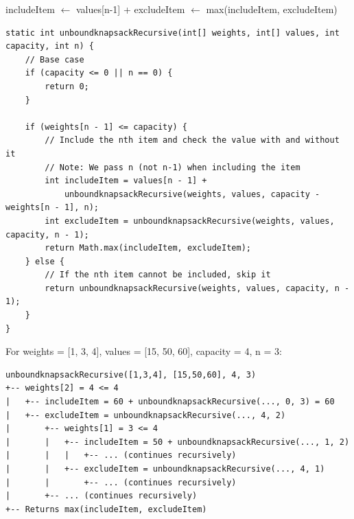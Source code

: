 \documentclass{article}
\begin{document}
\begin{tcolorbox}[title=Algorithm: Recursive Approach]
\begin{algorithm}[H]
\begin{algorithmic}[1]
    \EndIf
    
        \State includeItem $\gets$ values[n-1] + 
        \State excludeItem $\gets$ 
        \Return max(includeItem, excludeItem)
    \Else
        \Return {}
    \EndIf
\EndFunction
\end{algorithmic}
\end{algorithm}
\end{tcolorbox}

\begin{lstlisting}[caption=Recursive Implementation]
static int unboundknapsackRecursive(int[] weights, int[] values, int capacity, int n) {
    // Base case
    if (capacity <= 0 || n == 0) {
        return 0;
    }

    if (weights[n - 1] <= capacity) {
        // Include the nth item and check the value with and without it
        // Note: We pass n (not n-1) when including the item
        int includeItem = values[n - 1] + 
            unboundknapsackRecursive(weights, values, capacity - weights[n - 1], n);
        int excludeItem = unboundknapsackRecursive(weights, values, capacity, n - 1);
        return Math.max(includeItem, excludeItem);
    } else {
        // If the nth item cannot be included, skip it
        return unboundknapsackRecursive(weights, values, capacity, n - 1);
    }
}
\end{lstlisting}

\begin{tcolorbox}[examplebox, title=Recursive Call Tree Example]
For weights = [1, 3, 4], values = [15, 50, 60], capacity = 4, n = 3:

\small
\begin{verbatim}
unboundknapsackRecursive([1,3,4], [15,50,60], 4, 3)
+-- weights[2] = 4 <= 4
|   +-- includeItem = 60 + unboundknapsackRecursive(..., 0, 3) = 60
|   +-- excludeItem = unboundknapsackRecursive(..., 4, 2)
|       +-- weights[1] = 3 <= 4
|       |   +-- includeItem = 50 + unboundknapsackRecursive(..., 1, 2)
|       |   |   +-- ... (continues recursively)
|       |   +-- excludeItem = unboundknapsackRecursive(..., 4, 1)
|       |       +-- ... (continues recursively)
|       +-- ... (continues recursively)
+-- Returns max(includeItem, excludeItem)
\end{verbatim}
\end{tcolorbox}
\end{document}
